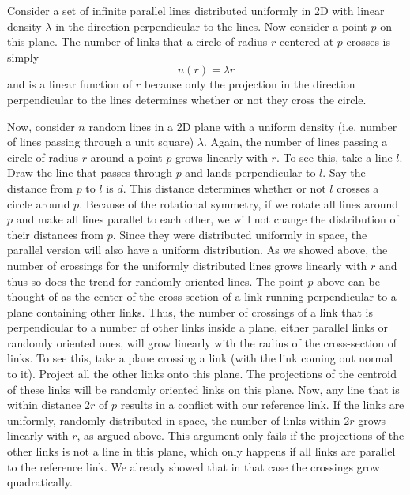 \documentclass[endfloats,nofootinbib,preprint,floatfix,titlepage,superscriptaddress,linenumbers]{revtex4-1} %
\begin{document}
Consider a set of infinite parallel lines distributed uniformly in 2D with linear density $\lambda$ in the direction perpendicular to the lines. Now consider a point $p$ on this plane. The number of links that a circle of radius $r$ centered at $p$ crosses is simply
\[n(r) = \lambda r \] 
and is a linear function of $r$ because only the projection in the direction perpendicular to the lines determines whether or not they cross the circle. 

Now, consider $n$ random lines in a 2D plane with a uniform density (i.e. number of lines passing through a unit square) $\lambda$. Again, the number of lines passing a circle of radius $r$ around a point $p$ grows linearly with $r$. To see this, take a line $l$. Draw the line that passes through $p$ and lands perpendicular to $l$. Say the distance from $p$ to $l$ is $d$. 
This distance determines whether or not $l$ crosses a circle around $p$. Because of the rotational symmetry, if we rotate all lines around $p$ and make all lines parallel to each other, we will not change the distribution of their distances from $p$. Since they were distributed uniformly in space, the parallel version will also have a uniform distribution. As we showed above, the number of crossings for the uniformly distributed lines grows linearly with $r$ and thus so does the trend for randomly oriented lines. 
The point $p$ above can be thought of as the center of the cross-section of a link running perpendicular to a plane containing other links. 
Thus, the number of crossings of a link that is perpendicular to a number of other links inside a plane, either parallel links or randomly oriented ones, will grow linearly with the radius of the cross-section of links. 
To see this, take a plane crossing a link (with the link coming out normal to it). 
Project all the other links onto this plane. 
The projections of the centroid of these links will be randomly oriented links on this plane. 
Now, any line that is within distance $2r$ of $p$ results in a conflict with our reference link. 
If the links are uniformly, randomly distributed in space, the number of links within $2r$ grows linearly with $r$, as argued above. 
This argument only fails if the projections of the other links is not a line in this plane, which only happens if all links are parallel to the reference link. 
We already showed that in that case the crossings grow quadratically. 

\end{document}
